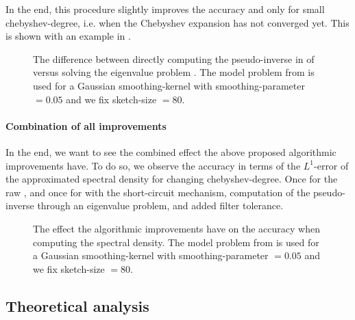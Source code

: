 In the end, this procedure slightly improves the accuracy
and only for small \gls{chebyshev-degree}, i.e. when the Chebyshev expansion has
not converged yet. This is shown with an example in .\\

\begin{figure}[ht]
    \centering
    
    \caption{The difference between directly computing the pseudo-inverse
        in  of 
        versus solving the eigenvalue problem .
        The model problem from 
        is used for a Gaussian \gls{smoothing-kernel} with \gls{smoothing-parameter} $=0.05$
        and we fix \gls{sketch-size} $=80$.}
    \label{fig:3-nystrom-eigenvalue-problem}
\end{figure}

\paragraph{Combination of all improvements}

In the end, we want to see the combined effect the above proposed algorithmic
improvements have. To do so, we observe the accuracy in terms of the $L^1$-error
of the approximated spectral density for changing \gls{chebyshev-degree}. Once
for the raw , and once for 
with the short-circuit mechanism, computation of the pseudo-inverse through
an eigenvalue problem, and added filter tolerance.

\begin{figure}[ht]
    \centering
    
    \caption{The effect the algorithmic improvements have on the accuracy when
        computing the spectral density.
        The model problem from 
        is used for a Gaussian \gls{smoothing-kernel} with \gls{smoothing-parameter} $=0.05$
        and we fix \gls{sketch-size} $=80$.}
    \label{fig:3-nystrom-improved-algorithm}
\end{figure}


\subsection{Theoretical analysis}
\label{subsec:3-nystrom-theoretical-analysis}


